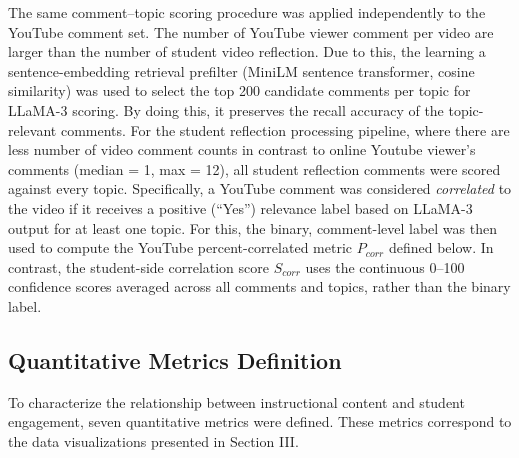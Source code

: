 The same comment--topic scoring procedure was applied independently to the YouTube comment set. The number of YouTube viewer comment per video are larger than the number of student video reflection. Due to this, the learning a sentence-embedding retrieval prefilter (MiniLM sentence transformer, cosine similarity) was used to select the top 200 candidate comments per topic for LLaMA-3 scoring. By doing this, it preserves the recall accuracy of the topic-relevant comments. For the student reflection processing pipeline, where there are less number of video comment counts in contrast to online Youtube viewer's comments (median = 1, max = 12), all student reflection comments were scored against every topic. Specifically, a YouTube comment was considered \emph{correlated} to the video if it receives a positive (``Yes'') relevance label based on LLaMA-3 output for at least one topic. For this, the binary, comment-level label was then used to compute the YouTube percent-correlated metric $P_{corr}$ defined below. In contrast, the student-side correlation score $S_{corr}$ uses the continuous 0--100 confidence scores averaged across all comments and topics, rather than the binary label.


\subsection{Quantitative Metrics Definition}

To characterize the relationship between instructional content and student engagement, seven quantitative metrics were defined. These metrics correspond to the data visualizations presented in Section III.

